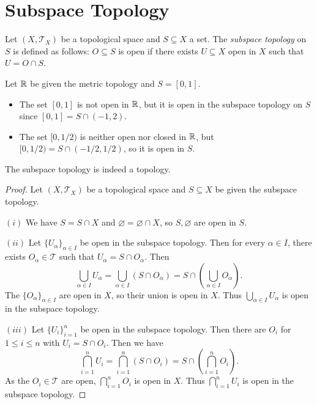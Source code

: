 \section{Subspace Topology}

\begin{definition}
  Let $(X, \mathcal{T}_X)$ be a topological space
  and $S \subseteq X$ a set. The \emph{subspace topology}
  on $S$ is defined as follows:
  $O \subseteq S$ is open if there exists $U \subseteq X$
  open in $X$ such that $U = O \cap S$.
\end{definition}

\begin{example}
  Let $\mathbb{R}$ be given the metric topology and
  $S = [0, 1]$.
  \begin{itemize}
    \item The set $[0, 1]$ is not open
      in $\mathbb{R}$, but it is open in the subspace
      topology on $S$ since
      $[0, 1] = S \cap (-1, 2)$.
    \item The set $[0, 1 / 2)$ is neither open nor closed
      in $\mathbb{R}$, but
      $[0, 1 / 2) = S \cap (-1 / 2, 1 / 2)$,
      so it is open in $S$.
  \end{itemize}
\end{example}

\begin{theorem}
  The subspace topology is indeed a topology.
\end{theorem}

\begin{proof}
  Let $(X, \mathcal{T}_X)$ be a topological
  space and $S \subseteq X$ be given the subspace
  topology.

  $(i)$ We have $S = S \cap X$ and
  $\varnothing = \varnothing \cap X$, so
  $S, \varnothing$ are open in $S$.

  $(ii)$ Let $\{U_\alpha\}_{\alpha \in I}$
  be open in the subspace topology. Then
  for every $\alpha \in I$, there exists
  $O_\alpha \in \mathcal{T}$
  such that $U_\alpha = S \cap O_\alpha$. Then
  \[
    \bigcup_{\alpha \in I} U_\alpha
    = \bigcup_{\alpha \in I} (S \cap O_\alpha)
    = S \cap \left( \bigcup_{\alpha \in I} O_\alpha \right).
  \]
  The $\{O_\alpha\}_{\alpha \in I}$ are
  open in $X$, so their union is open in $X$.
  Thus $\bigcup_{\alpha \in I} U_\alpha$ is open
  in the subspace topology.

  $(iii)$ Let $\{U_i\}_{i = 1}^n $ be open in the
  subspace topology. Then there are
  $O_i$ for $1 \le i \le n$ with
  $U_i = S \cap O_i$. Then we have
  \[
    \bigcap_{i = 1}^n U_i
    = \bigcap_{i = 1}^n (S \cap O_i)
    = S \cap \left( \bigcap_{i = 1}^n O_i \right).
  \]
  As the $O_i \in \mathcal{T}$ are open,
  $\bigcap_{i = 1}^n O_i$ is open in $X$.
  Thus $\bigcap_{i = 1}^n U_i$ is open in the
  subspace topology.
\end{proof}


